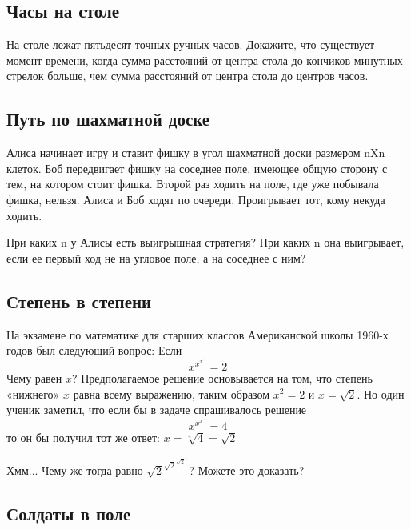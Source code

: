 \subsection*{Часы на столе} %



На столе лежат пятьдесят точных ручных часов. 
Докажите, что существует момент времени, когда сумма расстояний от центра стола до кончиков  минутных стрелок  больше, чем сумма расстояний от центра стола до центров часов.

\subsection*{Путь по шахматной доске}    %

Алиса начинает игру и ставит фишку в угол шахматной доски размером nXn клеток. Боб передвигает фишку на соседнее поле, имеющее общую сторону с тем, на котором стоит фишка. 
Второй раз ходить на поле, где уже побывала фишка, нельзя.  
Алиса и Боб ходят по очереди. 
Проигрывает тот, кому некуда ходить.

При каких n у Алисы есть выигрышная стратегия?  При каких n она выигрывает, если ее первый ход не на угловое поле, а на соседнее с ним?




\subsection*{Степень в степени} %



На экзамене по математике для старших классов Американской школы 1960-х годов 
был следующий вопрос:
Если 
$$x^{x^{x^{{\cdot}^{\cdot^{\cdot}}}}}=2$$
Чему равен  $x$? 
Предполагаемое решение основывается на том, что степень «нижнего» $x$ равна всему выражению, таким образом $x^2=2$ и $x=\sqrt{2}$.
Но один ученик заметил, что если бы в задаче спрашивалось решение
$$x^{x^{x^{{\cdot}^{\cdot^{\cdot}}}}}=4$$
то он бы получил тот же ответ: $x=\sqrt[4]{4}=\sqrt{2}$

Хмм... Чему же тогда равно  ${\sqrt{2}}^{{\sqrt{2}}^{{\sqrt{2}}^{{\cdot}^{\cdot^{\cdot}}}}}$? 
Можете это доказать?


\subsection*{Солдаты в поле}        %



